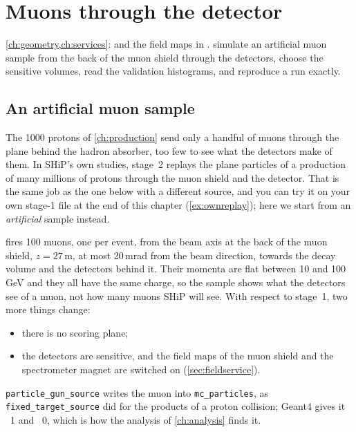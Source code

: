 \chapter{Muons through the detector}
\label{ch:aegir}

{\cref{ch:geometry,ch:services}:  and the field maps
in .}
{simulate an artificial muon sample from the back of the muon shield through
the detectors, choose the sensitive volumes, read the validation histograms,
and reproduce a run exactly.}

\section{An artificial muon sample}

The 1000 protons of \cref{ch:production} send only a handful of muons
through the plane behind the hadron absorber, too few to see what the
detectors make of them. In SHiP's own studies, stage~2 replays the plane
particles of a production of many millions of protons through the muon shield
and the detector. That is the same job as the one below with a different
source, and you can try it on your own stage-1 file at the end of this chapter
(\cref{ex:ownreplay}); here we start from an \emph{artificial} sample instead.

 fires 100 muons, one per event, from
the beam axis at the back of the muon shield, $z=27$\,m, at most 20\,mrad
from the beam direction, towards the decay volume and the detectors behind
it. Their momenta are flat between 10 and 100\,GeV and they all have the same
charge, so the sample shows what the detectors see of a muon, not how many
muons SHiP will see. With respect to stage~1, two more things change:
\begin{itemize}
  \item there is no scoring plane;
  \item the detectors are sensitive, and the field maps of the muon shield and
        the spectrometer magnet are switched on (\cref{sec:fieldservice}).
\end{itemize}


\texttt{particle\_gun\_source} writes the muon into \texttt{mc\_particles},
as \texttt{fixed\_target\_source} did for the products of a proton collision;
Geant4 gives it ~1 and ~0, which is how the
analysis of \cref{ch:analysis} finds it.

